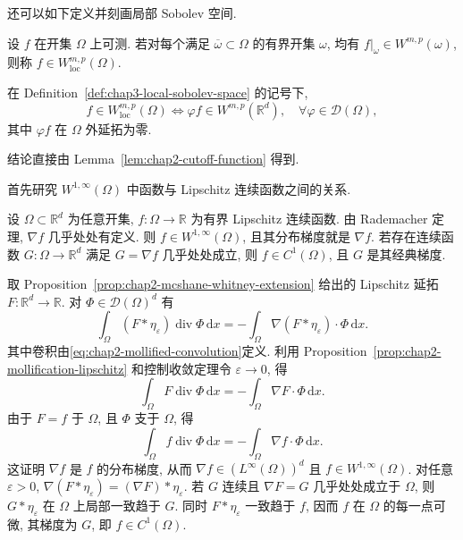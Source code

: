 还可以如下定义并刻画局部 Sobolev 空间.

\begin{Definition}
\label{def:chap3-local-sobolev-space}
设 $f$ 在开集 $\Omega$ 上可测. 若对每个满足 $\overline\omega\subset\Omega$ 的有界开集 $\omega$, 均有 $f|_\omega\in W^{m,p}(\omega)$, 则称 $f\in W_{\mathrm{loc}}^{m,p}(\Omega)$.
\end{Definition}

\begin{Proposition}
\label{prop:chap3-local-sobolev-characterization}
在 Definition~\ref{def:chap3-local-sobolev-space} 的记号下,
\[
 f\in W_{\mathrm{loc}}^{m,p}(\Omega)
 \Longleftrightarrow \varphi f\in W^{m,p}(\mathbb R^d),\quad\forall\varphi\in\mathcal D(\Omega),
\]
其中 $\varphi f$ 在 $\Omega$ 外延拓为零.
\end{Proposition}

\begin{Proof}
结论直接由 Lemma~\ref{lem:chap2-cutoff-function} 得到.
\end{Proof}

首先研究 $W^{1,\infty}(\Omega)$ 中函数与 Lipschitz 连续函数之间的关系.

\begin{Proposition}
\label{prop:chap3-lipschitz-function-in-w1infty}
设 $\Omega\subset\mathbb R^d$ 为任意开集, $f:\Omega\to\mathbb R$ 为有界 Lipschitz 连续函数. 由 Rademacher 定理, $\nabla f$ 几乎处处有定义. 则 $f\in W^{1,\infty}(\Omega)$, 且其分布梯度就是 $\nabla f$. 若存在连续函数 $G:\Omega\to\mathbb R^d$ 满足 $G=\nabla f$ 几乎处处成立, 则 $f\in C^1(\Omega)$, 且 $G$ 是其经典梯度.
\end{Proposition}

\begin{Proof}
取 Proposition~\ref{prop:chap2-mcshane-whitney-extension} 给出的 Lipschitz 延拓 $F:\mathbb R^d\to\mathbb R$. 对 $\Phi\in\mathcal D(\Omega)^d$ 有
\[
 \int_\Omega(F*\eta_\varepsilon)\operatorname{div}\Phi\,\mathrm dx
 =-\int_\Omega\nabla(F*\eta_\varepsilon)\cdot\Phi\,\mathrm dx.
\]
其中卷积由\eqref{eq:chap2-mollified-convolution}定义. 利用 Proposition~\ref{prop:chap2-mollification-lipschitz} 和控制收敛定理令 $\varepsilon\to0$, 得
\[
 \int_\Omega F\operatorname{div}\Phi\,\mathrm dx
 =-\int_\Omega\nabla F\cdot\Phi\,\mathrm dx.
\]
由于 $F=f$ 于 $\Omega$, 且 $\Phi$ 支于 $\Omega$, 得
\[
 \int_\Omega f\operatorname{div}\Phi\,\mathrm dx
 =-\int_\Omega\nabla f\cdot\Phi\,\mathrm dx.
\]
这证明 $\nabla f$ 是 $f$ 的分布梯度, 从而 $\nabla f\in(L^\infty(\Omega))^d$ 且 $f\in W^{1,\infty}(\Omega)$. 对任意 $\varepsilon>0$, $\nabla(F*\eta_\varepsilon)=(\nabla F)*\eta_\varepsilon$. 若 $G$ 连续且 $\nabla F=G$ 几乎处处成立于 $\Omega$, 则 $G*\eta_\varepsilon$ 在 $\Omega$ 上局部一致趋于 $G$. 同时 $F*\eta_\varepsilon$ 一致趋于 $f$, 因而 $f$ 在 $\Omega$ 的每一点可微, 其梯度为 $G$, 即 $f\in C^1(\Omega)$.
\end{Proof}

